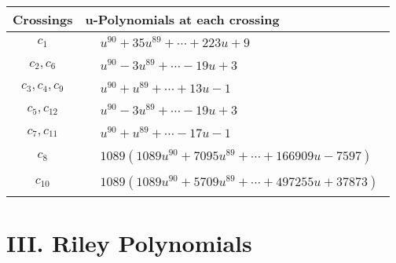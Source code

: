 \documentclass[1p]{elsarticle_modified}
\theoremstyle{definition}
\begin{document}
\begin{tabular}{m{50pt}|m{274pt}}
Crossings & \hspace{64pt}u-Polynomials at each crossing \\
\hline $$\begin{aligned}c_{1}\end{aligned}$$&$\begin{aligned}
&u^{90}+35 u^{89}+\cdots+223 u+9
\end{aligned}$\\
\hline $$\begin{aligned}c_{2},c_{6}\end{aligned}$$&$\begin{aligned}
&u^{90}-3 u^{89}+\cdots-19 u+3
\end{aligned}$\\
\hline $$\begin{aligned}c_{3},c_{4},c_{9}\end{aligned}$$&$\begin{aligned}
&u^{90}+u^{89}+\cdots+13 u-1
\end{aligned}$\\
\hline $$\begin{aligned}c_{5},c_{12}\end{aligned}$$&$\begin{aligned}
&u^{90}-3 u^{89}+\cdots-19 u+3
\end{aligned}$\\
\hline $$\begin{aligned}c_{7},c_{11}\end{aligned}$$&$\begin{aligned}
&u^{90}+u^{89}+\cdots-17 u-1
\end{aligned}$\\
\hline $$\begin{aligned}c_{8}\end{aligned}$$&$\begin{aligned}
&1089(1089 u^{90}+7095 u^{89}+\cdots+166909 u-7597)
\end{aligned}$\\
\hline $$\begin{aligned}c_{10}\end{aligned}$$&$\begin{aligned}
&1089(1089 u^{90}+5709 u^{89}+\cdots+497255 u+37873)
\end{aligned}$\\
\hline
\end{tabular}\newpage\renewcommand{\arraystretch}{1}
\centering \section*{ III. Riley Polynomials}
\end{document}
